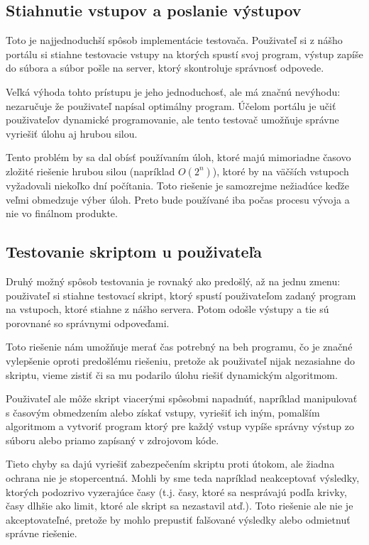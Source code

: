 \subsection{Stiahnutie vstupov a poslanie výstupov}
\label{testovac1}
Toto je najjednoduchší spôsob implementácie testovača. Použivateľ si z nášho portálu si stiahne testovacie vstupy na ktorých spustí
svoj program, výstup zapíše do súbora a súbor pošle na server, ktorý skontroluje správnosť odpovede.

 Veľká výhoda tohto prístupu je jeho jednoduchosť, ale má značnú nevýhodu: nezaručuje že použivateľ napísal optimálny program.
Účelom portálu je učiť použivateľov dynamické programovanie, ale tento testovač umožňuje správne vyriešiť úlohu aj hrubou silou.

Tento problém by sa dal obísť používaním úloh, ktoré majú mimoriadne časovo zložité riešenie hrubou silou (napríklad \(O(2^n)\)), ktoré by na väčších vstupoch
vyžadovali niekoľko dní počítania.
Toto riešenie je samozrejme nežiadúce keďže veľmi obmedzuje výber úloh. Preto bude používané iba počas procesu vývoja a nie vo finálnom produkte.

\subsection{Testovanie skriptom u použivateľa}

\label{testovac2}
Druhý možný spôsob testovania je rovnaký ako predošlý, až na jednu zmenu: použivateľ si stiahne testovací skript, ktorý spustí použivateľom zadaný program
na vstupoch, ktoré stiahne z nášho servera. Potom odošle výstupy a tie sú porovnané so správnymi odpoveďami.

Toto riešenie nám umožňuje merať čas potrebný na beh programu, čo je značné vylepšenie oproti predošlému riešeniu, pretože ak použivateľ nijak nezasiahne
do skriptu, vieme zistiť či sa mu podarilo úlohu riešiť dynamickým algoritmom.

Použivateľ ale môže skript viacerými spôsobmi napadnúť, napríklad manipulovať s časovým obmedzením alebo získať vstupy, vyriešiť ich iným, pomalším algoritmom a
vytvoriť program ktorý pre každý vstup vypíše správny výstup zo súboru alebo priamo zapísaný v zdrojovom kóde.

Tieto chyby sa dajú vyriešiť zabezpečením skriptu proti útokom, ale žiadna ochrana nie je stopercentná. Mohli by sme teda napríklad neakceptovať výsledky, ktorých podozrivo vyzerajúce
časy (t.j. časy, ktoré sa nesprávajú podľa krivky, časy dlhšie ako limit, ktoré ale skript sa nezastavil atď.). Toto riešenie ale nie je akceptovateľné, pretože by mohlo prepustiť
falšované výsledky alebo odmietnuť správne riešenie.

